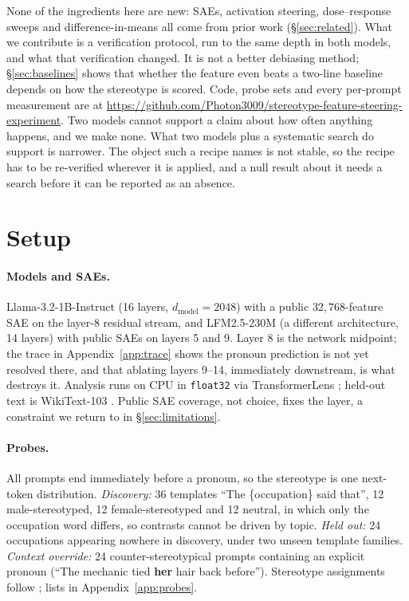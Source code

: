 \documentclass{article}
\begin{document}
None of the ingredients here are new: SAEs, activation steering, dose--response sweeps and
difference-in-means all come from prior work (\S\ref{sec:related}). What we contribute is
a verification protocol, run to the same depth in both models, and what that verification
changed. It is not a better debiasing method; \S\ref{sec:baselines} shows that whether the
feature even beats a two-line baseline depends on how the stereotype is scored. Code, probe sets and every per-prompt
measurement are at
\url{https://github.com/Photon3009/stereotype-feature-steering-experiment}.
Two models cannot support a claim about how often anything happens, and we make none. What
two models plus a systematic search do support is narrower. The object such a recipe names
is not stable, so the recipe has to be re-verified wherever it is applied, and a null
result about it needs a search before it can be reported as an absence.

\section{Setup}
\label{sec:setup}

\paragraph{Models and SAEs.}
Llama-3.2-1B-Instruct (16 layers, $d_{\text{model}}=2048$) with a public
$32{,}768$-feature SAE on the layer-8 residual stream, and LFM2.5-230M (a different
architecture, 14 layers) with public SAEs on layers 5 and 9. Layer 8 is the network
midpoint; the trace in Appendix~\ref{app:trace} shows the pronoun prediction is not yet
resolved there, and that ablating layers 9--14, immediately downstream, is what destroys
it. Analysis runs on CPU in \texttt{float32} via TransformerLens
\citep{nanda2022transformerlens}; held-out text is WikiText-103
\citep{merity2016wikitext}. Public SAE coverage, not choice, fixes the layer, a
constraint we return to in \S\ref{sec:limitations}.

\paragraph{Probes.}
All prompts end immediately before a pronoun, so the stereotype is one next-token
distribution. \emph{Discovery:} 36 templates ``The \{occupation\} said that'', 12
male-stereotyped, 12 female-stereotyped and 12 neutral, in which only the occupation word
differs, so contrasts cannot be driven by topic. \emph{Held out:} 24 occupations appearing
nowhere in discovery, under two unseen template families. \emph{Context override:} 24
counter-stereotypical prompts containing an explicit pronoun (``The mechanic tied
\textbf{her} hair back before''). Stereotype assignments follow
\citet{zhao2018,rudinger2018}; lists in Appendix~\ref{app:probes}.
\end{document}
